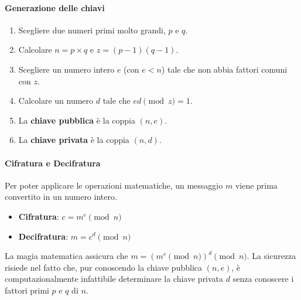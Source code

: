 \paragraph{Generazione delle chiavi}
\begin{enumerate}
    \item Scegliere due numeri primi molto grandi, $p$ e $q$.
    \item Calcolare $n = p \times q$ e $z = (p-1)(q-1)$.
    \item Scegliere un numero intero $e$ (con $e < n$) tale che non abbia fattori comuni con $z$.
    \item Calcolare un numero $d$ tale che $ed \pmod z = 1$.
    \item La \textbf{chiave pubblica} è la coppia $(n, e)$.
    \item La \textbf{chiave privata} è la coppia $(n, d)$.
\end{enumerate}

\paragraph{Cifratura e Decifratura}
Per poter applicare le operazioni matematiche, un messaggio $m$ viene prima convertito in un numero intero.
\begin{itemize}
    \item \textbf{Cifratura}: $c = m^e \pmod n$
    \item \textbf{Decifratura}: $m = c^d \pmod n$
\end{itemize}
La magia matematica assicura che $m = (m^e \pmod n)^d \pmod n$. La sicurezza risiede nel fatto che, pur conoscendo la chiave pubblica $(n, e)$, è computazionalmente infattibile determinare la chiave privata $d$ senza conoscere i fattori primi $p$ e $q$ di $n$.



